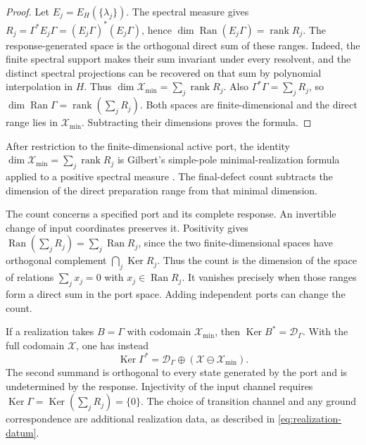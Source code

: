 \documentclass[11pt,reqno]{scrartcl}
\DeclareMathOperator{\Ran}{Ran}
\DeclareMathOperator{\Ker}{Ker}
\newcommand{\scrX}{\mathscr X}
\newcommand{\Hmin}{\mathscr X_{\min}}
\theoremstyle{plain}
\theoremstyle{definition}
\theoremstyle{remark}
\begin{document}
\begin{proof}
Let \(E_j=E_H(\{\lambda_j\})\).  The spectral measure gives
\(R_j=\Gamma^*E_j\Gamma=(E_j\Gamma)^*(E_j\Gamma)\), hence
\(\dim\Ran(E_j\Gamma)=\operatorname{rank}R_j\).
The response-generated space is the orthogonal direct sum of these ranges.
Indeed, the finite spectral support makes their sum invariant under every
resolvent, and the distinct spectral projections can be recovered on that
sum by polynomial interpolation in \(H\).  Thus
\(\dim\Hmin=\sum_j\operatorname{rank}R_j\).
Also \(\Gamma^*\Gamma=\sum_jR_j\), so
\(\dim\Ran\Gamma=\operatorname{rank}(\sum_jR_j)\).
Both spaces are finite-dimensional and the direct range lies in \(\Hmin\).
Subtracting their dimensions proves the formula.
\end{proof}

After restriction to the finite-dimensional active port, the identity
$\dim\Hmin=\sum_j\operatorname{rank}R_j$ is Gilbert's
simple-pole minimal-realization formula applied to a positive spectral
measure \cite[Theorem~7]{Gilbert1963}.  The final-defect count
subtracts the dimension of the direct preparation range from that
minimal dimension.

The count concerns a specified port and its complete response.  An
invertible change of input coordinates preserves it.  Positivity gives
\(\Ran(\sum_j R_j)=\sum_j\Ran R_j\), since the two finite-dimensional
spaces have orthogonal complement \(\bigcap_j\Ker R_j\).
Thus the count is the dimension of the space of relations
\(\sum_j x_j=0\) with \(x_j\in\Ran R_j\).  It vanishes precisely when
those ranges form a direct sum in the port space.  Adding independent
ports can change the count.

If a realization takes \(B=\Gamma\) with codomain \(\Hmin\), then
\(\Ker B^*=\mathcal D_\Gamma\).  With the full codomain \(\scrX\), one
has instead
\begin{equation}
  \Ker\Gamma^*=\mathcal D_\Gamma\oplus(\scrX\ominus\Hmin).
  \label{eq:ambient-response-defect}
\end{equation}
The second summand is orthogonal to every state generated by the port
and is undetermined by the response.  Injectivity of the input channel
requires \(\Ker\Gamma=\Ker(\sum_j R_j)=\{0\}\).
The choice of transition channel and any ground correspondence are
additional realization data, as described in \cref{eq:realization-datum}.
\end{document}

